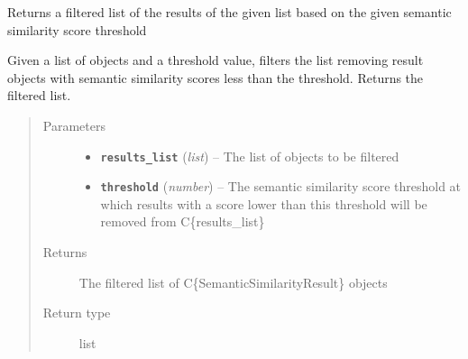 \documentclass[letterpaper,10pt,english]{sphinxmanual}
\begin{document}
\begin{fulllineitems}
\label{wntest:semsim.wntest.filter_results}
Returns a filtered list of the results of the given list based on the given semantic similarity score threshold

Given a list of {\hyperref[wntest:semsim.wntest.SemanticSimilarityResult]{\emph{}}} objects and a threshold value, filters the list removing result objects with semantic similarity scores less than the threshold. Returns the filtered list.
\begin{quote}\begin{description}
\item[{Parameters}] \leavevmode\begin{itemize}
\item {} 
\textbf{\texttt{results\_list}} (\emph{list}) -- The list of {\hyperref[wntest:semsim.wntest.SemanticSimilarityResult]{\emph{}}} objects to be filtered

\item {} 
\textbf{\texttt{threshold}} (\emph{number}) -- The semantic similarity score threshold at which results with a score lower than this threshold will be removed from C\{results\_list\}

\end{itemize}

\item[{Returns}] \leavevmode
The filtered list of C\{SemanticSimilarityResult\} objects

\item[{Return type}] \leavevmode
list

\end{description}\end{quote}

\end{fulllineitems}

\end{document}
